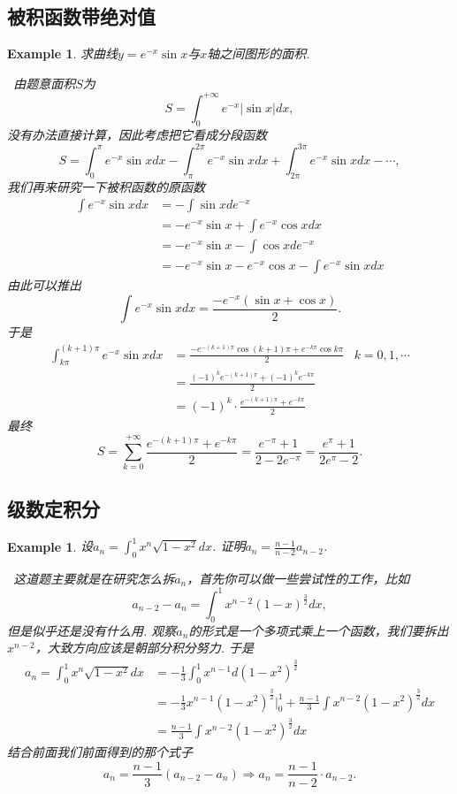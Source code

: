 \documentclass{article}
\newtheorem{example}[theorem]{Example}
\newcommand{\hints}{{\color{blue} \text{hints}}}
\begin{document}
\subsection{被积函数带绝对值}

\begin{example}
\rm 求曲线$y=e^{-x}\sin x$与$x$轴之间图形的面积. 

\hints\ 由题意面积$S$为
$$
S = \int_0^{+\infty} e^{-x}|\sin x|dx,
$$
没有办法直接计算，因此考虑把它看成分段函数
$$
S = \int_0^{\pi} e^{-x}\sin xdx - \int_\pi^{2\pi} e^{-x}\sin xdx + \int_{2\pi}^{3\pi} e^{-x}\sin xdx - \cdots, 
$$ 
我们再来研究一下被积函数的原函数
$$
\begin{aligned}
\int e^{-x}\sin xdx &= -\int \sin xde^{-x} \\
&= -e^{-x}\sin x + \int e^{-x}\cos xdx \\
&= -e^{-x}\sin x -\int \cos x de^{-x} \\
&= -e^{-x}\sin x -e^{-x}\cos x -\int e^{-x}\sin xdx 
\end{aligned}
$$
由此可以推出
$$
\int e^{-x}\sin xdx = \frac{-e^{-x}(\sin x + \cos x)}{2}.
$$
于是
$$
\begin{aligned}
\int_{k\pi}^{(k+1)\pi} e^{-x}\sin x dx &= \frac{-e^{-(k+1)\pi} \cos(k+1)\pi + e^{-k\pi}\cos k\pi}{2} & k=0,1,\cdots \\
& = \frac{(-1)^k e^{-(k+1)\pi} + (-1)^k e^{-k\pi}}{2} \\
& = (-1)^k \cdot \frac{e^{-(k+1)\pi} + e^{-k\pi}}{2}   
\end{aligned}
$$
最终
$$
S = \sum\limits_{k=0}^{+\infty}  \frac{e^{-(k+1)\pi} + e^{-k\pi}}{2} = \frac{e^{-\pi}+1}{2-2e^{-\pi}} = \frac{e^{\pi} + 1}{2e^{\pi}-2}.
$$
\end{example}

\subsection{级数定积分}

\begin{example}
\rm 设$a_n = \int_0^1 x^n \sqrt{1-x^2}dx$. 证明$a_n = \frac{n-1}{n-2}a_{n-2}$. 

\hints\ 这道题主要就是在研究怎么拆$a_n$，首先你可以做一些尝试性的工作，比如
$$
a_{n-2}-a_n = \int_0^1 x^{n-2}(1-x)^{\frac{3}{2}}dx,
$$
但是似乎还是没有什么用. 观察$a_n$的形式是一个多项式乘上一个函数，我们要拆出$x^{n-2}$，大致方向应该是朝部分积分努力. 于是
$$
\begin{aligned}
a_n = \int_0^1 x^n \sqrt{1-x^2}dx &= -\frac{1}{3}\int_0^1  x^{n-1}d(1-x^2)^\frac{3}{2} \\
&= -\frac{1}{3}x^{n-1}(1-x^2)^{\frac{3}{2}} |_{0}^1 + \frac{n-1}{3} \int x^{n-2}(1-x^2)^\frac{3}{2} dx \\
&=  \frac{n-1}{3} \int x^{n-2}(1-x^2)^\frac{3}{2} dx
\end{aligned}
$$
结合前面我们前面得到的那个式子
$$
a_n = \frac{n-1}{3}(a_{n-2}-a_n) \Rightarrow a_n = \frac{n-1}{n-2} \cdot a_{n-2}. 
$$
\end{example}
\end{document}
